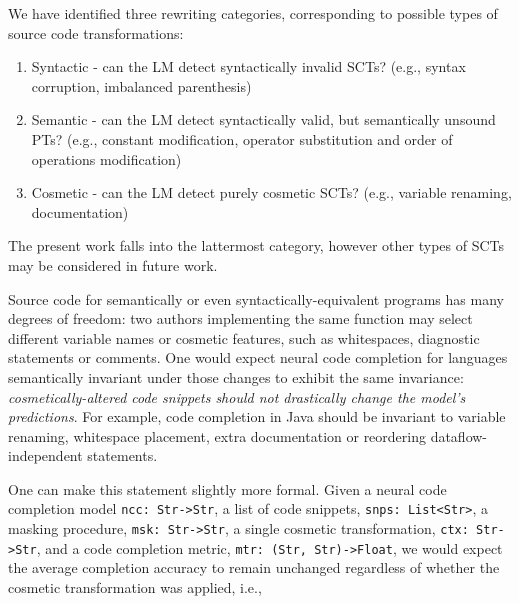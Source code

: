 \documentclass[sigconf,review,anonymous]{acmart}
\begin{document}

  We have identified three rewriting categories, corresponding to possible types of source code transformations:

  \begin{enumerate}[itemsep=1ex]
    \item Syntactic - can the LM detect syntactically invalid SCTs? (e.g., syntax corruption, imbalanced parenthesis)
    \item Semantic - can the LM detect syntactically valid, but semantically unsound PTs? (e.g., constant modification, operator substitution and order of operations modification)
    \item Cosmetic - can the LM detect purely cosmetic SCTs? (e.g., variable renaming, documentation)
  \end{enumerate}

  The present work falls into the lattermost category, however other types of SCTs may be considered in future work.

  Source code for semantically or even syntactically-equivalent programs has many degrees of freedom: two authors implementing the same function may select different variable names or cosmetic features, such as whitespaces, diagnostic statements or comments. One would expect neural code completion for languages semantically invariant under those changes to exhibit the same invariance: \textit{cosmetically-altered code snippets should not drastically change the model's predictions}. For example, code completion in Java should be invariant to variable renaming, whitespace placement, extra documentation or reordering dataflow-independent statements.

  One can make this statement slightly more formal. Given a neural code completion model \lstinline|ncc: Str->Str|, a list of code snippets, \lstinline|snps: List<Str>|, a masking procedure, \lstinline|msk: Str->Str|, a single cosmetic transformation, \lstinline|ctx: Str->Str|, and a code completion metric, \lstinline|mtr: (Str, Str)->Float|, we would expect the average completion accuracy to remain unchanged regardless of whether the cosmetic transformation was applied, i.e.,
\end{document}
